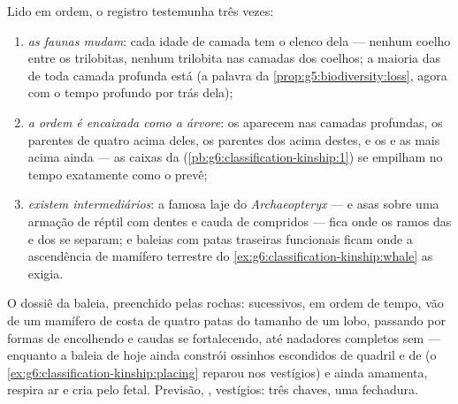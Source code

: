 \begin{proposition}\label{prop:g9:evidence-of-evolution:record}
Lido em ordem, o registro testemunha três vezes:
\begin{enumerate}
  \item \emph{as faunas mudam}: cada idade de camada tem o
        elenco dela --- nenhum coelho entre os trilobitas,
        nenhum trilobita nas camadas dos coelhos; a maioria
        das  de toda camada profunda está
        \emph{} (a palavra da
        \cref{prop:g5:biodiversity:loss}, agora com o tempo
        profundo por trás dela);
  \item \emph{a ordem é encaixada como a árvore}: os 
        aparecem nas camadas profundas, os parentes 
        de quatro  acima deles, os parentes dos
         acima destes, e os  e as  mais
        acima ainda --- as caixas da 
        (\cref{pb:g6:classification-kinship:1}) se empilham
        no tempo exatamente como o  prevê;
  \item \emph{existem intermediários}: a famosa laje do
        \emph{Archaeopteryx} ---  e asas sobre uma
        armação de réptil com dentes e cauda de 
        compridos --- fica onde os ramos das  e dos
         se separam; e baleias  com patas
        traseiras funcionais ficam onde a ascendência de
        mamífero terrestre do
        \cref{ex:g6:classification-kinship:whale} as exigia.
\end{enumerate}
\end{proposition}
\admitted

\begin{example}\label{ex:g9:evidence-of-evolution:whales}
O dossiê da baleia, preenchido pelas rochas: 
sucessivos, em ordem de tempo, vão de um mamífero de costa de
quatro patas do tamanho de um lobo, passando por formas de
 encolhendo e caudas se fortalecendo, até nadadores
completos sem  --- enquanto a baleia de hoje ainda
constrói ossinhos escondidos de quadril e de  (o
\cref{ex:g6:classification-kinship:placing} reparou nos
vestígios) e ainda amamenta, respira ar e cria pelo fetal.
Previsão, , vestígios: três chaves, uma fechadura.
\end{example}

